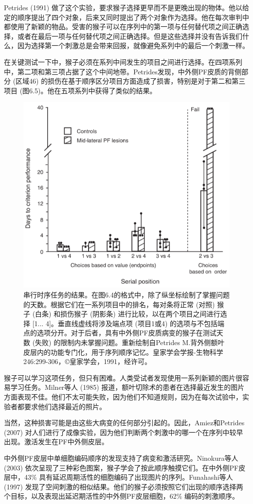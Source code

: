 Petrides (1991) 做了这个实验，要求猴子选择更早而不是更晚出现的物体。他以给定的顺序提出了四个对象，后来又同时提出了两个对象作为选择。他在每次审判中都使用了新颖的物品。受害的猴子可以在序列中的第一项与任何替代项之间正确选择，或者在最后一项与任何替代项之间正确选择。但是这些选择并没有告诉我们什么，因为选择第一个刺激总是会带来回报，就像避免系列中的最后一个刺激一样。

在关键测试一下中，猴子必须在系列中间发生的项目之间进行选择。在四项系列中，第二项和第三项占据了这个中间地带。Petrides发现，中外侧PF皮质的背侧部分 (区域46) 的损伤在基于顺序区分项目方面造成了损害，特别是对于第二和第三项目 (图6.5)。他在五项系列中获得了类似的结果。
\begin{figure}
	\centering
	\includegraphics[width=0.5\linewidth]{image_pfc/Fig_6_5}
	\caption{串行时序任务的结果。在图6.4的格式中，除了纵坐标绘制了掌握问题的天数。根据它们在一系列项目中的排名，每对条将正常 (对照) 猴子 (白条) 和损伤猴子 (阴影条) 进行比较，以在两个项目之间进行选择 [1... 4]。垂直线虚线将涉及端点项 (项目1或4) 的选项与不包括端点的选项分开。对于后者，具有中外侧PF皮质病变的猴子在测试天数 (失败) 的限制内未掌握问题。重新绘制自Petrides M.背外侧额叶皮层内的功能专门化，用于序列顺序记忆。皇家学会学报-生物科学246:299-306，©皇家学会，1991，经许可。}
	\label{fig:fig}
\end{figure}
猴子可以学习这项任务，但只有困难。人类受试者发现使用一系列新颖的图片很容易学习任务。Milner等人 (1985) 报道，额叶切除术的患者在选择最近发生的图片方面表现不佳。他们不太可能失败，因为他们不知道规则，因为在每次试验中，实验者都要求他们选择最近的照片。

当然，这种损害可能是由这些大病变的任何部分引起的。因此，Amiez和Petrides (2007) 对人们进行了成像实验，因为他们判断两个刺激中的哪一个在序列中较早出现。激活发生在PF中外侧皮层。

中外侧PF皮层中单细胞编码顺序的发现支持了病变和激活研究。Ninokura等人 (2003) 依次呈现了三种彩色图案，猴子学会了按此顺序触摸它们。在中外侧PF皮层中，43\% 具有延迟周期活性的细胞编码了出现图片的序列。Funahashi等人 (1997) 发现了空间刺激的相似结果。他们的猴子必须按照它们出现的顺序选择两个目标，以及表现出延迟期活性的中外侧PF皮层细胞，62\% 编码的刺激顺序。

